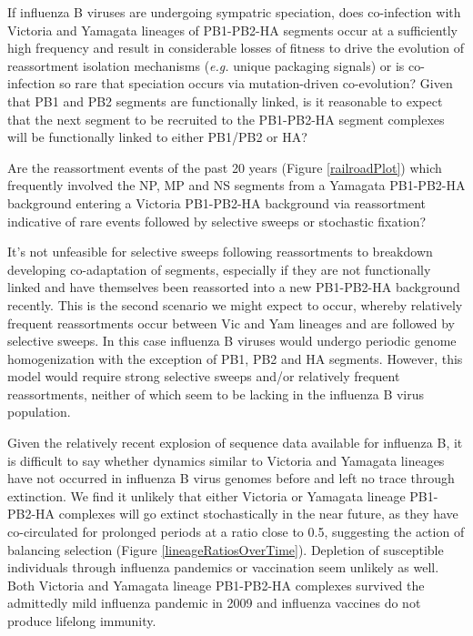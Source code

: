 \documentclass[11pt,oneside,letterpaper]{article}
\begin{document}
If influenza B viruses are undergoing sympatric speciation, does co-infection with Victoria and Yamagata lineages of PB1-PB2-HA segments occur at a sufficiently high frequency and result in considerable losses of fitness to drive the evolution of reassortment isolation mechanisms (\textit{e.g.} unique packaging signals) or is co-infection so rare that speciation occurs via mutation-driven co-evolution?
Given that PB1 and PB2 segments are functionally linked, is it reasonable to expect that the next segment to be recruited to the PB1-PB2-HA segment complexes will be functionally linked to either PB1/PB2 or HA?

Are the reassortment events of the past 20 years (Figure \ref{railroadPlot}) which frequently involved the NP, MP and NS segments from a Yamagata PB1-PB2-HA background entering a Victoria PB1-PB2-HA background via reassortment indicative of rare events followed by selective sweeps or stochastic fixation?

It's not unfeasible for selective sweeps following reassortments to breakdown developing co-adaptation of segments, especially if they are not functionally linked and have themselves been reassorted into a new PB1-PB2-HA background recently.
This is the second scenario we might expect to occur, whereby relatively frequent reassortments occur between Vic and Yam lineages and are followed by selective sweeps.
In this case influenza B viruses would undergo periodic genome homogenization with the exception of PB1, PB2 and HA segments.
However, this model would require strong selective sweeps and/or relatively frequent reassortments, neither of which seem to be lacking in the influenza B virus population.

Given the relatively recent explosion of sequence data available for influenza B, it is difficult to say whether dynamics similar to Victoria and Yamagata lineages have not occurred in influenza B virus genomes before and left no trace through extinction.
We find it unlikely that either Victoria or Yamagata lineage PB1-PB2-HA complexes will go extinct stochastically in the near future, as they have co-circulated for prolonged periods at a ratio close to 0.5, suggesting the action of balancing selection (Figure \ref{lineageRatiosOverTime}).
Depletion of susceptible individuals through influenza pandemics or vaccination seem unlikely as well.
Both Victoria and Yamagata lineage PB1-PB2-HA complexes survived the admittedly mild influenza pandemic in 2009 and influenza vaccines do not produce lifelong immunity.
\end{document}
